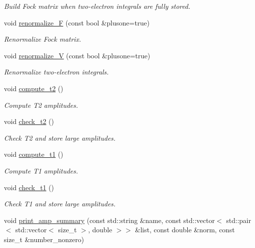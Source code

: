 \begin{DoxyCompactItemize}
\begin{DoxyCompactList}\small\item\em Build Fock matrix when two-\/electron integrals are fully stored. \end{DoxyCompactList}\item 
void \mbox{\hyperlink{classforte_1_1_d_s_r_g___m_r_p_t3_a592593cdbd5cbf0024bc5f9520b4a88d}{renormalize\+\_\+F}} (const bool \&plusone=true)
\begin{DoxyCompactList}\small\item\em Renormalize Fock matrix. \end{DoxyCompactList}\item 
void \mbox{\hyperlink{classforte_1_1_d_s_r_g___m_r_p_t3_aaf25a724d9aeeafb121d56abd71f0748}{renormalize\+\_\+V}} (const bool \&plusone=true)
\begin{DoxyCompactList}\small\item\em Renormalize two-\/electron integrals. \end{DoxyCompactList}\item 
void \mbox{\hyperlink{classforte_1_1_d_s_r_g___m_r_p_t3_a0358b0213517f969fda06fbcbe86ea94}{compute\+\_\+t2}} ()
\begin{DoxyCompactList}\small\item\em Compute T2 amplitudes. \end{DoxyCompactList}\item 
void \mbox{\hyperlink{classforte_1_1_d_s_r_g___m_r_p_t3_a2312c6b70f31b23da999119623f5d633}{check\+\_\+t2}} ()
\begin{DoxyCompactList}\small\item\em Check T2 and store large amplitudes. \end{DoxyCompactList}\item 
void \mbox{\hyperlink{classforte_1_1_d_s_r_g___m_r_p_t3_aff426cbae8aba3b3df9a9817a13280d0}{compute\+\_\+t1}} ()
\begin{DoxyCompactList}\small\item\em Compute T1 amplitudes. \end{DoxyCompactList}\item 
void \mbox{\hyperlink{classforte_1_1_d_s_r_g___m_r_p_t3_a6ae32df9118f9ee9c9a8f5a37c81c601}{check\+\_\+t1}} ()
\begin{DoxyCompactList}\small\item\em Check T1 and store large amplitudes. \end{DoxyCompactList}\item 
void \mbox{\hyperlink{classforte_1_1_d_s_r_g___m_r_p_t3_acc86f6e843feea90ab27a456ccdca039}{print\+\_\+amp\+\_\+summary}} (const std\+::string \&name, const std\+::vector$<$ std\+::pair$<$ std\+::vector$<$ size\+\_\+t $>$, double $>$$>$ \&list, const double \&norm, const size\+\_\+t \&number\+\_\+nonzero)
$$
\end{DoxyCompactItemize}
